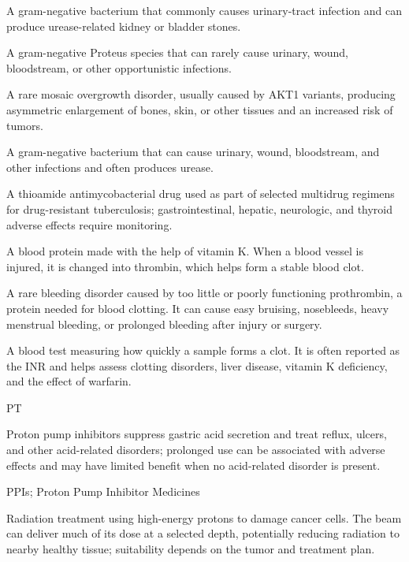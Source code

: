  A gram-negative bacterium that commonly causes urinary-tract infection and can produce urease-related kidney or bladder stones.

 A gram-negative Proteus species that can rarely cause urinary, wound, bloodstream, or other opportunistic infections.

 A rare mosaic overgrowth disorder, usually caused by AKT1 variants, producing asymmetric enlargement of bones, skin, or other tissues and an increased risk of tumors.

 A gram-negative bacterium that can cause urinary, wound, bloodstream, and other infections and often produces urease.

 A thioamide antimycobacterial drug used as part of selected multidrug regimens for drug-resistant tuberculosis; gastrointestinal, hepatic, neurologic, and thyroid adverse effects require monitoring.

 A blood protein made with the help of vitamin K. When a blood vessel is injured, it is changed into thrombin, which helps form a stable blood clot.

 A rare bleeding disorder caused by too little or poorly functioning prothrombin, a protein needed for blood clotting. It can cause easy bruising, nosebleeds, heavy menstrual bleeding, or prolonged bleeding after injury or surgery.

 A blood test measuring how quickly a sample forms a clot. It is often reported as the INR and helps assess clotting disorders, liver disease, vitamin K deficiency, and the effect of warfarin.

\synonyms
PT

 Proton pump inhibitors suppress gastric acid secretion and treat reflux, ulcers, and other acid-related disorders; prolonged use can be associated with adverse effects and may have limited benefit when no acid-related disorder is present.

\synonyms
PPIs; Proton Pump Inhibitor Medicines

 Radiation treatment using high-energy protons to damage cancer cells. The beam can deliver much of its dose at a selected depth, potentially reducing radiation to nearby healthy tissue; suitability depends on the tumor and treatment plan.


